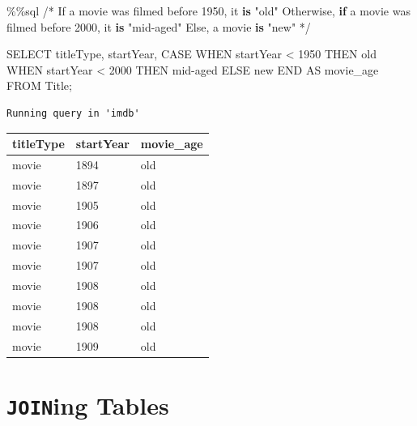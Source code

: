 \documentclass[
  letterpaper,
  DIV=11,
  numbers=noendperiod]{scrreprt}
\newenvironment{Shaded}{\begin{snugshade}}{\end{snugshade}}
\newcommand{\ControlFlowTok}[1]{\textcolor[rgb]{0.00,0.23,0.31}{\textbf{#1}}}
\newcommand{\DecValTok}[1]{\textcolor[rgb]{0.68,0.00,0.00}{#1}}
\newcommand{\KeywordTok}[1]{\textcolor[rgb]{0.00,0.23,0.31}{\textbf{#1}}}
\newcommand{\NormalTok}[1]{\textcolor[rgb]{0.00,0.23,0.31}{#1}}
\newcommand{\OperatorTok}[1]{\textcolor[rgb]{0.37,0.37,0.37}{#1}}
\newcommand{\StringTok}[1]{\textcolor[rgb]{0.13,0.47,0.30}{#1}}
\begin{document}
\begin{Shaded}
\begin{Highlighting}[]
\OperatorTok{\%\%}\NormalTok{sql}
\OperatorTok{/*}\NormalTok{ If a movie was filmed before }\DecValTok{1950}\NormalTok{, it }\KeywordTok{is} \StringTok{"old"}
\NormalTok{Otherwise, }\ControlFlowTok{if}\NormalTok{ a movie was filmed before }\DecValTok{2000}\NormalTok{, it }\KeywordTok{is} \StringTok{"mid{-}aged"}
\NormalTok{Else, a movie }\KeywordTok{is} \StringTok{"new"} \OperatorTok{*/}

\NormalTok{SELECT titleType, startYear,}
\NormalTok{CASE WHEN startYear }\OperatorTok{\textless{}} \DecValTok{1950}\NormalTok{ THEN }\StringTok{\textquotesingle{}old\textquotesingle{}}
\NormalTok{     WHEN startYear }\OperatorTok{\textless{}} \DecValTok{2000}\NormalTok{ THEN }\StringTok{\textquotesingle{}mid{-}aged\textquotesingle{}}
\NormalTok{     ELSE }\StringTok{\textquotesingle{}new\textquotesingle{}}
\NormalTok{     END AS movie\_age}
\NormalTok{FROM Title}\OperatorTok{;}
\end{Highlighting}
\end{Shaded}

\begin{verbatim}
Running query in 'imdb'
\end{verbatim}

\begin{longtable}[]{@{}lll@{}}
\toprule\noalign{}
titleType & startYear & movie\_age \\
\midrule\noalign{}
\endhead
\bottomrule\noalign{}
\endlastfoot
movie & 1894 & old \\
movie & 1897 & old \\
movie & 1905 & old \\
movie & 1906 & old \\
movie & 1907 & old \\
movie & 1907 & old \\
movie & 1908 & old \\
movie & 1908 & old \\
movie & 1908 & old \\
movie & 1909 & old \\
\end{longtable}

\section{\texorpdfstring{\texttt{JOIN}ing
Tables}{JOINing Tables}}\label{joining-tables-1}
\end{document}

